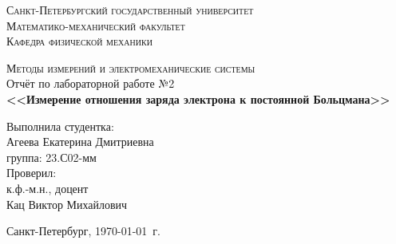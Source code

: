 \begin{titlepage}
\begin{center}
\textsc{Санкт-Петербургский государственный университет\\
Математико-механический факультет\\
Кафедра физической механики\\}

\vfill

\textsc{Методы измерений и электромеханические системы\\[3mm]}
Отчёт по лабораторной работе №2\\[6mm]


\textbf{\large<<Измерение отношения заряда электрона к постоянной Больцмана>>}

\vfill
\end{center}

\hfill
\begin{minipage}{.5\textwidth}
Выполнила студентка:\\[2mm] 
Агеева Екатерина Дмитриевна\\
группа: 23.С02-мм\\[5mm]

Проверил:\\[2mm] 
к.ф.-м.н., доцент\\
Кац Виктор Михайлович
\end{minipage}%
\vfill
\begin{center}
 Санкт-Петербург, \yeardate\today\ г.
\end{center}
\end{titlepage}